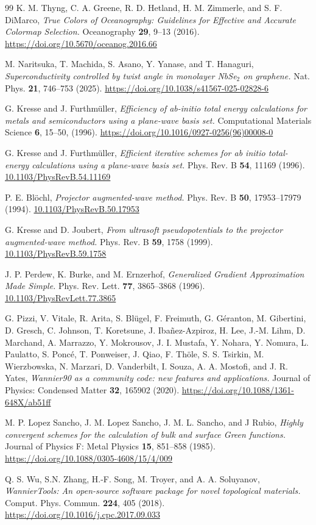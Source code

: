 \documentclass[reprint,superscriptaddress,prb,aps]{revtex4-2}
\begin{document}
\begin{thebibliography}{99}
K. M. Thyng, C. A. Greene, R. D. Hetland, H. M. Zimmerle, and S. F. DiMarco,
\textit{True Colors of Oceanography: Guidelines for Effective and Accurate Colormap Selection.}
Oceanography \textbf{29}, 9--13 (2016).
\url{https://doi.org/10.5670/oceanog.2016.66}


M. Naritsuka, T. Machida, S. Asano, Y. Yanase, and T. Hanaguri,
\textit{Superconductivity controlled by twist angle in monolayer NbSe$_{2}$ on graphene.}
Nat. Phys. \textbf{21}, 746--753 (2025).
\url{https://doi.org/10.1038/s41567-025-02828-6}


G. Kresse and J. Furthm\"{u}ller,
\textit{Efficiency of ab-initio total energy calculations for metals and semiconductors using a plane-wave basis set.}
Computational Materials Science \textbf{6}, 15--50, (1996).
\url{https://doi.org/10.1016/0927-0256(96)00008-0}


G. Kresse and J. Furthm\"{u}ller,
\textit{Efficient iterative schemes for ab initio total-energy calculations using a plane-wave basis set.}
Phys. Rev. B \textbf{54}, 11169 (1996).
\url{10.1103/PhysRevB.54.11169}


P. E. Bl\"{o}chl,
\textit{Projector augmented-wave method.}
Phys. Rev. B \textbf{50}, 17953--17979 (1994).
\url{10.1103/PhysRevB.50.17953}


G. Kresse and D. Joubert,
\textit{From ultrasoft pseudopotentials to the projector augmented-wave method.}
Phys. Rev. B \textbf{59}, 1758 (1999).
\url{10.1103/PhysRevB.59.1758}


J. P. Perdew, K. Burke, and M. Ernzerhof,
\textit{Generalized Gradient Approximation Made Simple.}
Phys. Rev. Lett. \textbf{77}, 3865--3868 (1996).
\url{10.1103/PhysRevLett.77.3865}


G. Pizzi, V. Vitale, R. Arita, S. Bl\"{u}gel, F. Freimuth, G. G\'{e}ranton, M. Gibertini, D. Gresch, C. Johnson, T. Koretsune, J. Iba\~{n}ez-Azpiroz, H. Lee, J.-M. Lihm, D. Marchand, A. Marrazzo, Y. Mokrousov, J. I. Mustafa, Y. Nohara, Y. Nomura, L. Paulatto, S. Ponc\'{e}, T. Ponweiser, J. Qiao, F. Th\"{o}le, S. S. Tsirkin, M. Wierzbowska, N. Marzari, D. Vanderbilt, I. Souza, A. A. Mostofi, and J. R. Yates,
\textit{Wannier90 as a community code: new features and applications.}
Journal of Physics: Condensed Matter \textbf{32}, 165902 (2020).
\url{https://doi.org/10.1088/1361-648X/ab51ff}


M. P. Lopez Sancho, J. M. Lopez Sancho, J. M. L. Sancho, and J Rubio,
\textit{Highly convergent schemes for the calculation of bulk and surface Green functions.}
Journal of Physics F: Metal Physics \textbf{15}, 851--858 (1985).
\url{https://doi.org/10.1088/0305-4608/15/4/009}


Q. S. Wu, S.N. Zhang, H.-F. Song, M. Troyer, and A. A. Soluyanov,
\textit{WannierTools: An open-source software package for novel topological materials.}
Comput. Phys. Commun. \textbf{224}, 405 (2018).
\url{https://doi.org/10.1016/j.cpc.2017.09.033}


\end{thebibliography}
\end{document}

